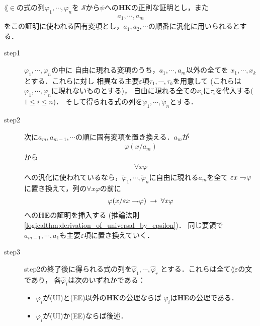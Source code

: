 	\begin{metaprf}
		$\lang{\in}$の式の列$\varphi_{1},\cdots,\varphi_{n}$を
		$\mathscr{S}$から$\psi$への{\bf HK}の正則な証明とし，また
		\begin{align}
			a_{1},\cdots,a_{m}
		\end{align}
		をこの証明に使われる固有変項とし，$a_{1},a_{2},\cdots$の順番に汎化に用いられるとする．
	
		\begin{description}
			\item[step1]
				$\varphi_{1},\cdots,\varphi_{n}$の中に
				自由に現れる変項のうち，$a_{1},\cdots,a_{m}$以外の全てを
				$x_{1},\cdots,x_{k}$とする．これらに対し
				相異なる主要$\varepsilon$項$\tau_{1},\cdots,\tau_{k}$を用意して
				(これらは$\varphi_{1},\cdots,\varphi_{n}$に現れないものとする)，
				自由に現れる全ての$x_{i}$に$\tau_{i}$を代入する($1 \leq i \leq n$)．
				そして得られる式の列を$\tilde{\varphi}_{1},\cdots,\tilde{\varphi}_{n}$とする．
				
			\item[step2]
				次に$a_{m},a_{m-1},\cdots$の順に固有変項を置き換える．$a_{m}$が
				\begin{align}
					\varphi(x/a_{m})
				\end{align}
				から
				\begin{align}
					\forall x \varphi
				\end{align}
				への汎化に使われているなら，$\tilde{\varphi}_{1},\cdots,
				\tilde{\varphi}_{n}$に自由に現れる$a_{m}$を全て
				$\varepsilon x \rightharpoondown\hspace{-0.25em} \varphi$に置き換えて，列の$\forall x \varphi$の前に
				\begin{align}
					\varphi(x/\varepsilon x \rightharpoondown\hspace{-0.25em} \varphi) 
					\hspace{0.25em}\rightarrow\hspace{0.25em} \forall x \varphi
				\end{align}
				への{\bf HE}の証明を挿入する
				(推論法則\ref{logicalthm:derivation_of_universal_by_epsilon})．
				同じ要領で$a_{m-1},\cdots,a_{1}$も主要$\varepsilon$項に置き換えていく．
				
			\item[step3]
				step2の終了後に得られる式の列を$\hat{\varphi}_{1},\cdots,\hat{\varphi}_{r}$
				とする．これらは全て$\lang{\varepsilon}$の文であり，
				各$\hat{\varphi}_{i}$は次のいずれかである：
				\begin{itemize}
					\item $\varphi_{i}$が(UI)と(EE)以外の{\bf HK}の公理ならば
						$\hat{\varphi}_{i}$は{\bf HE}の公理である．
						
					\item $\varphi_{i}$が(UI)か(EE)ならば後述．
					

\end{itemize}
\end{description}
\end{metaprf}
